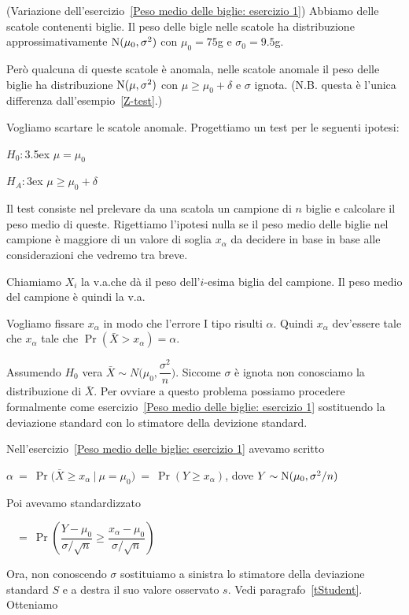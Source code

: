 \documentclass[11pt,openany]{book}
\begin{document}
(Variazione dell'esercizio~\ref{Peso medio delle biglie: esercizio 1}) Abbiamo delle scatole contenenti biglie.
Il peso delle bigle nelle scatole ha distribuzione approssimativamente  ${\rm N}(\mu_0,\sigma^2)$ con $\mu_0=75$g e $\sigma_0=9.5$g. 

Però qualcuna di queste scatole è anomala, nelle scatole anomale il peso delle biglie ha distribuzione ${\rm N}(\mu,\sigma^2)$ con $\mu\ge\mu_0+\delta$ e $\sigma$ ignota. (N.B. questa è l'unica differenza dall'esempio~\ref{Z-test}.)

Vogliamo scartare le scatole anomale. 
Progettiamo un test per le seguenti ipotesi:

$H_0:$\kern3.5ex $\mu=\mu_0$

$H_A:$\kern3ex $\mu\ge\mu_0+\delta$

Il test consiste nel prelevare da una scatola un campione di $n$ biglie e calcolare il peso medio di queste. 
Rigettiamo l'ipotesi nulla se il peso medio delle biglie nel campione è maggiore di un valore di soglia $x_\alpha$ da decidere in base in base alle considerazioni che vedremo tra breve.

Chiamiamo $X_i$ la v.a.\@ che dà il peso dell'$i$-esima biglia del campione.
Il peso medio del campione è quindi la v.a.\@



Vogliamo fissare $x_\alpha$ in modo che l'errore I tipo risulti $\alpha$. 
Quindi $x_\alpha$ dev'essere tale che $x_\alpha$ tale che $\Pr(\bar X>x_\alpha)=\alpha$.

Assumendo $H_0$ vera $\bar X\sim N\bigg(\mu_0,\dfrac{\sigma^2}{n}\bigg)$.
Siccome $\sigma$ è ignota non conosciamo la distribuzione di $\bar X$.
Per ovviare a questo problema possiamo procedere formalmente come esercizio~\ref{Peso medio delle biglie: esercizio 1} sostituendo la deviazione standard con lo stimatore della devizione standard. 

Nell'esercizio~\ref{Peso medio delle biglie: esercizio 1} avevamo scritto

$\alpha\ =\ \Pr\big(\bar X\ge x_\alpha\ \mathbin\big|\ \mu=\mu_0\big)\ =\ \Pr(Y\ge x_\alpha)$, dove $Y\sim {\rm N}(\mu_0,\sigma^2/n)$

Poi avevamo standardizzato\medskip

$\phantom{\alpha}\ =\ \Pr\left(\dfrac{Y-\mu_0}{\sigma/\sqrt{n}}\ge \dfrac{x_\alpha-\mu_0}{\sigma/\sqrt{n}}\right)$\medskip

Ora, non conoscendo $\sigma$ sostituiamo a sinistra lo stimatore della deviazione standard $S$ e a destra il suo valore osservato $s$.
Vedi paragrafo~\ref{tStudent}.
Otteniamo\medskip
\end{document}
